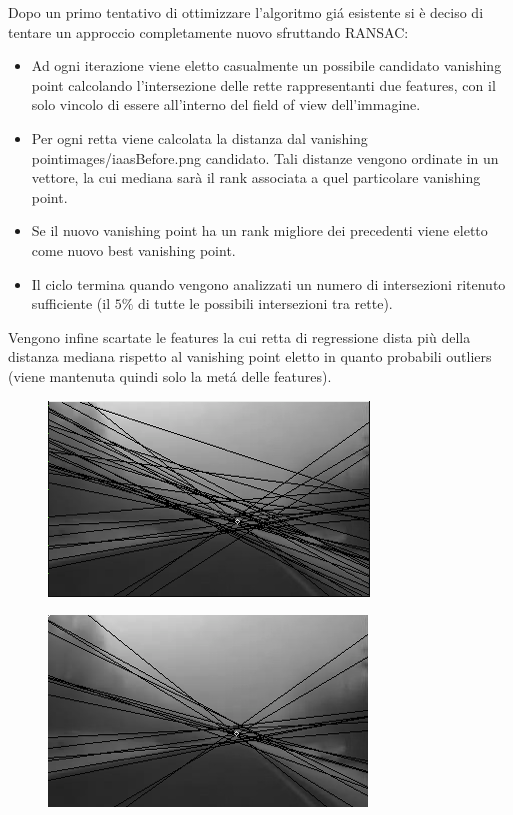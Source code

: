 \documentclass[12pt]{report}
\begin{document}
\noindent Dopo un primo tentativo di ottimizzare l'algoritmo gi\'a esistente si \`e deciso di tentare un approccio completamente nuovo sfruttando RANSAC:

\begin{itemize}
\item	Ad ogni iterazione viene eletto casualmente un possibile candidato vanishing point calcolando l'intersezione delle rette rappresentanti due features, con il solo vincolo di essere all'interno del field of view dell'immagine.
\item	Per ogni retta viene calcolata la distanza dal vanishing pointimages/iaasBefore.png candidato. Tali distanze vengono ordinate in un vettore, la cui mediana sar\`a il rank associata a quel particolare vanishing point.
\item	Se il nuovo vanishing point ha un rank migliore dei precedenti viene eletto come nuovo best vanishing point.
\item	Il ciclo termina quando vengono analizzati un numero di intersezioni ritenuto sufficiente (il $5\%$ di tutte le possibili intersezioni tra rette).
\end{itemize}

\noindent Vengono infine scartate le features la cui retta di regressione dista pi\`u della distanza mediana rispetto al vanishing point eletto in quanto probabili outliers (viene mantenuta quindi solo la met\'a delle features).

\begin{figure}
	\begin{minipage}[b]{0.5\linewidth}
		\centering
		\includegraphics[scale=0.6]{images/iaasBefore.png}
		\label{fig:vpBef}
	\end{minipage}
	\hspace{0.5cm}
	\begin{minipage}[b]{0.5\linewidth}
		\centering
		\includegraphics[scale=0.6]{images/iaasAfter.png}
		\label{fig:vpAft}
	\end{minipage}
\end{figure}
\end{document}
